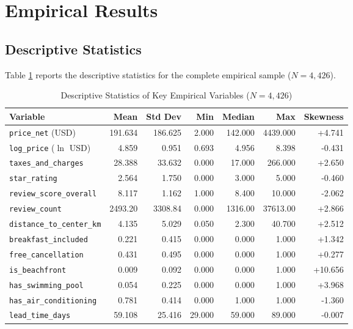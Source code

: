 \documentclass[11pt,a4paper]{article}
\begin{document}
\section{Empirical Results}

\subsection{Descriptive Statistics}
Table \ref{tab:desc_stats} reports the descriptive statistics for the complete empirical sample ($N = 4,426$).

\begin{table}[htbp]
\centering
\small
\caption{Descriptive Statistics of Key Empirical Variables ($N = 4,426$)}
\label{tab:desc_stats}
\begin{tabular*}{\textwidth}{@{\extracolsep{\fill}}lrrrrrr@{}}
\toprule
\textbf{Variable} & \textbf{Mean} & \textbf{Std Dev} & \textbf{Min} & \textbf{Median} & \textbf{Max} & \textbf{Skewness} \\
\midrule
\texttt{price\_net} (USD)       & 191.634 & 186.625 & 2.000  & 142.000 & 4439.000 & +4.741 \\
\texttt{log\_price} ($\ln$ USD) & 4.859   & 0.951   & 0.693  & 4.956   & 8.398    & -0.431 \\
\texttt{taxes\_and\_charges}    & 28.388  & 33.632  & 0.000  & 17.000  & 266.000  & +2.650 \\
\texttt{star\_rating}           & 2.564   & 1.750   & 0.000  & 3.000   & 5.000    & -0.460 \\
\texttt{review\_score\_overall} & 8.117   & 1.162   & 1.000  & 8.400   & 10.000   & -2.062 \\
\texttt{review\_count}          & 2493.20 & 3308.84 & 0.000  & 1316.00 & 37613.00 & +2.866 \\
\texttt{distance\_to\_center\_km}& 4.135  & 5.029   & 0.050  & 2.300   & 40.700   & +2.512 \\
\texttt{breakfast\_included}    & 0.221   & 0.415   & 0.000  & 0.000   & 1.000    & +1.342 \\
\texttt{free\_cancellation}     & 0.431   & 0.495   & 0.000  & 0.000   & 1.000    & +0.277 \\
\texttt{is\_beachfront}         & 0.009   & 0.092   & 0.000  & 0.000   & 1.000    & +10.656 \\
\texttt{has\_swimming\_pool}    & 0.054   & 0.225   & 0.000  & 0.000   & 1.000    & +3.968 \\
\texttt{has\_air\_conditioning} & 0.781   & 0.414   & 0.000  & 1.000   & 1.000    & -1.360 \\
\texttt{lead\_time\_days}       & 59.108  & 25.416  & 29.000 & 59.000  & 89.000   & -0.007 \\
\bottomrule
\end{tabular*}
\end{table}
\end{document}

